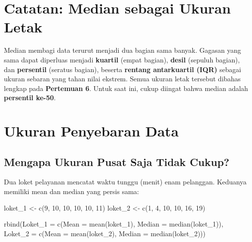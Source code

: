 \documentclass[
  indonesian,
  letterpaper,
]{book}
\newenvironment{Shaded}{\begin{snugshade}}{\end{snugshade}}
\newcommand{\AttributeTok}[1]{\textcolor[rgb]{0.40,0.45,0.13}{#1}}
\newcommand{\DecValTok}[1]{\textcolor[rgb]{0.68,0.00,0.00}{#1}}
\newcommand{\FunctionTok}[1]{\textcolor[rgb]{0.28,0.35,0.67}{#1}}
\newcommand{\NormalTok}[1]{\textcolor[rgb]{0.00,0.23,0.31}{#1}}
\newcommand{\OtherTok}[1]{\textcolor[rgb]{0.00,0.23,0.31}{#1}}
\begin{document}
\section{Catatan: Median sebagai Ukuran
Letak}\label{catatan-median-sebagai-ukuran-letak}

Median membagi data terurut menjadi dua bagian sama banyak. Gagasan yang
sama dapat diperluas menjadi \textbf{kuartil} (empat bagian),
\textbf{desil} (sepuluh bagian), dan \textbf{persentil} (seratus
bagian), beserta \textbf{rentang antarkuartil (IQR)} sebagai ukuran
sebaran yang tahan nilai ekstrem. Semua ukuran letak tersebut dibahas
lengkap pada \textbf{Pertemuan 6}. Untuk saat ini, cukup diingat bahwa
median adalah \textbf{persentil ke-50}.

\section{Ukuran Penyebaran Data}\label{ukuran-penyebaran-data}

\subsection{Mengapa Ukuran Pusat Saja Tidak
Cukup?}\label{mengapa-ukuran-pusat-saja-tidak-cukup}

Dua loket pelayanan mencatat waktu tunggu (menit) enam pelanggan.
Keduanya memiliki mean dan median yang persis sama:

\begin{Shaded}
\begin{Highlighting}[]
\NormalTok{loket\_1 }\OtherTok{\textless{}{-}} \FunctionTok{c}\NormalTok{(}\DecValTok{9}\NormalTok{, }\DecValTok{10}\NormalTok{, }\DecValTok{10}\NormalTok{, }\DecValTok{10}\NormalTok{, }\DecValTok{10}\NormalTok{, }\DecValTok{11}\NormalTok{)}
\NormalTok{loket\_2 }\OtherTok{\textless{}{-}} \FunctionTok{c}\NormalTok{(}\DecValTok{1}\NormalTok{, }\DecValTok{4}\NormalTok{, }\DecValTok{10}\NormalTok{, }\DecValTok{10}\NormalTok{, }\DecValTok{16}\NormalTok{, }\DecValTok{19}\NormalTok{)}

\FunctionTok{rbind}\NormalTok{(}\AttributeTok{Loket\_1 =} \FunctionTok{c}\NormalTok{(}\AttributeTok{Mean =} \FunctionTok{mean}\NormalTok{(loket\_1), }\AttributeTok{Median =} \FunctionTok{median}\NormalTok{(loket\_1)),}
\AttributeTok{Loket\_2 =} \FunctionTok{c}\NormalTok{(}\AttributeTok{Mean =} \FunctionTok{mean}\NormalTok{(loket\_2), }\AttributeTok{Median =} \FunctionTok{median}\NormalTok{(loket\_2)))}
\end{Highlighting}
\end{Shaded}
\end{document}
